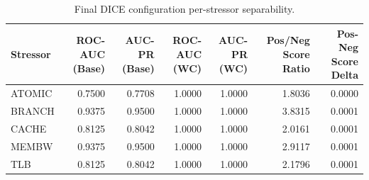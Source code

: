 \begin{table}[t]
\centering
\caption{Final DICE configuration per-stressor separability.}
\label{tab:dice_full_stressor}
\footnotesize
\begin{tabular}{lrrrrrr}
\toprule
Stressor & ROC-AUC (Base) & AUC-PR (Base) & ROC-AUC (WC) & AUC-PR (WC) & Pos/Neg Score Ratio & Pos-Neg Score Delta \\
\midrule
ATOMIC & 0.7500 & 0.7708 & 1.0000 & 1.0000 & 1.8036 & 0.0000 \\
BRANCH & 0.9375 & 0.9500 & 1.0000 & 1.0000 & 3.8315 & 0.0001 \\
CACHE & 0.8125 & 0.8042 & 1.0000 & 1.0000 & 2.0161 & 0.0001 \\
MEMBW & 0.9375 & 0.9500 & 1.0000 & 1.0000 & 2.9117 & 0.0001 \\
TLB & 0.8125 & 0.8042 & 1.0000 & 1.0000 & 2.1796 & 0.0001 \\
\bottomrule
\end{tabular}

\end{table}
